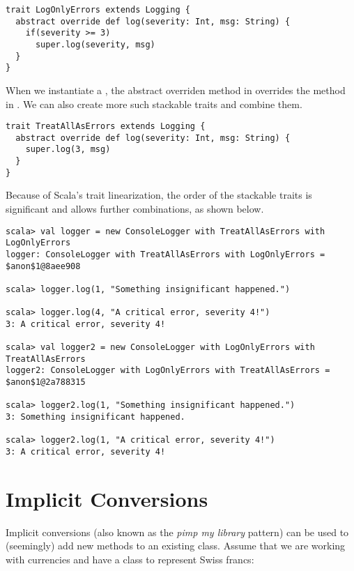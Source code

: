 \begin{lstlisting}
trait LogOnlyErrors extends Logging {
  abstract override def log(severity: Int, msg: String) {
    if(severity >= 3)
      super.log(severity, msg)
  }
}
\end{lstlisting}

When we instantiate a , the abstract overriden method in  overrides the  method in . We can also create more such stackable traits and combine them.

\begin{lstlisting}
trait TreatAllAsErrors extends Logging {
  abstract override def log(severity: Int, msg: String) {
    super.log(3, msg)
  }
}
\end{lstlisting}

Because of Scala's trait linearization, the order of the stackable traits is significant and allows further combinations, as shown below.

\begin{lstlisting}
scala> val logger = new ConsoleLogger with TreatAllAsErrors with LogOnlyErrors  
logger: ConsoleLogger with TreatAllAsErrors with LogOnlyErrors = $anon$1@8aee908

scala> logger.log(1, "Something insignificant happened.")

scala> logger.log(4, "A critical error, severity 4!")
3: A critical error, severity 4!

scala> val logger2 = new ConsoleLogger with LogOnlyErrors with TreatAllAsErrors
logger2: ConsoleLogger with LogOnlyErrors with TreatAllAsErrors = $anon$1@2a788315

scala> logger2.log(1, "Something insignificant happened.")
3: Something insignificant happened.

scala> logger2.log(1, "A critical error, severity 4!")
3: A critical error, severity 4!
\end{lstlisting}

\section{Implicit Conversions} \label{section:implicit-conversions}

Implicit conversions (also known as the \textit{pimp my library} pattern) can be used to (seemingly) add new methods to an existing class. Assume that we are working with currencies and have a class to represent Swiss francs:

